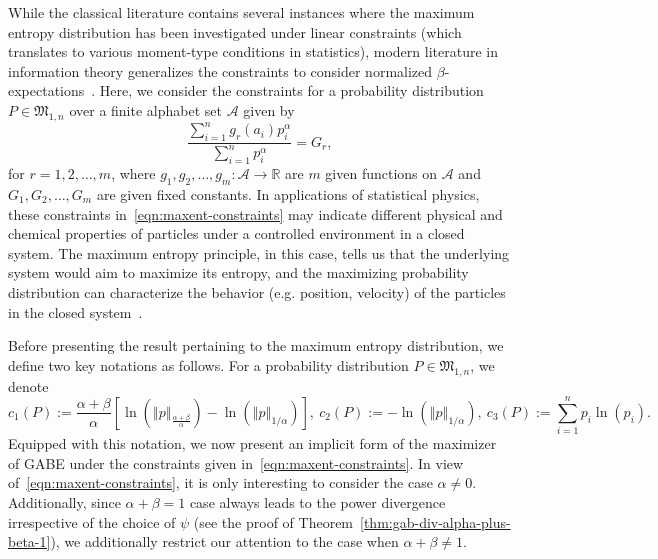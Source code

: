 \documentclass[11pt]{article}
\theoremstyle{plain}
\theoremstyle{remark}
\def\R{\mathbb{R}}
\newcommand{\Acal}{\mathcal{A}}
\newcommand{\Mfrak}{\mathfrak{M}}
\newcommand{\norm}[1]{\left\Vert #1 \right\Vert}
\begin{document}
While the classical literature contains several instances where the maximum entropy distribution has been investigated under linear constraints (which translates to various moment-type conditions in statistics), modern literature in information theory generalizes the constraints to consider normalized $\beta$-expectations~\citep{ghosh2021scale}. Here, we consider the constraints for a probability distribution $P \in \Mfrak_{1, n}$ over a finite alphabet set $\Acal$ given by
\begin{equation}
    \dfrac{\sum_{i=1}^n g_r(a_i)p_i^\alpha }{\sum_{i=1}^n p_i^\alpha} = G_r,
    \label{eqn:maxent-constraints}
\end{equation}
\noindent for $r = 1, 2, \dots, m$, where $g_1, g_2, \dots, g_m: \Acal \rightarrow \R$ are $m$ given functions on $\Acal$ and $G_1, G_2, \dots, G_m$ are given fixed constants. In applications of statistical physics, these constraints in~\eqref{eqn:maxent-constraints} may indicate different physical and chemical properties of particles under a controlled environment in a closed system. The maximum entropy principle, in this case, tells us that the underlying system would aim to maximize its entropy, and the maximizing probability distribution can characterize the behavior (e.g. position, velocity) of the particles in the closed system~\citep{jaynes1957information,kapur1992entropy}.


Before presenting the result pertaining to the maximum entropy distribution, we define two key notations as follows. For a probability distribution $P \in \Mfrak_{1, n}$, we denote
\begin{equation}
    c_1(P) := \frac{\alpha+\beta}{\alpha} \left[ \ln\left( \norm{p}_{\frac{\alpha+\beta}{\alpha}} \right) - \ln\left( \norm{p}_{1/\alpha} \right) \right], \
    c_2(P) := -\ln(\norm{p}_{1/\alpha}), \
    c_3(P) := \sum_{i=1}^n p_i \ln(p_i).
    \label{eqn:c1p-defn}
\end{equation}
\noindent Equipped with this notation, we now present an implicit form of the maximizer of GABE under the constraints given in~\eqref{eqn:maxent-constraints}. In view of~\eqref{eqn:maxent-constraints}, it is only interesting to consider the case $\alpha \neq 0$. Additionally, since $\alpha + \beta = 1$ case always leads to the power divergence irrespective of the choice of $\psi$ (see the proof of Theorem~\ref{thm:gab-div-alpha-plus-beta-1}), we additionally restrict our attention to the case when $\alpha + \beta \neq 1$.
\end{document}
